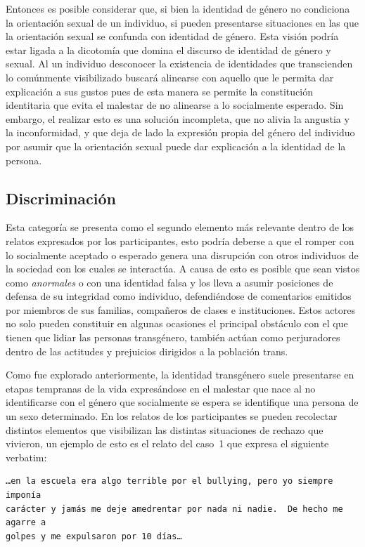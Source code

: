 Entonces es posible considerar que, si bien la identidad de género no condiciona
la orientación sexual de un individuo, si pueden presentarse situaciones en las
que la orientación sexual se confunda con identidad de género. Esta visión
podría estar ligada a la dicotomía que domina el discurso de identidad de género
y sexual. Al un individuo desconocer la existencia de identidades que
transcienden lo comúnmente visibilizado buscará alinearse con aquello que le
permita dar explicación a sus gustos pues de esta manera se permite la
constitución identitaria que evita el malestar de no alinearse a lo socialmente
esperado. Sin embargo, el realizar esto es una solución incompleta, que no
alivia la angustia y la inconformidad, y que deja de lado la expresión propia
del género del individuo por asumir que la orientación sexual puede dar
explicación a la identidad de la persona.

\subsection{Discriminación}\label{ssec:discriminacion}

Esta categoría se presenta como el segundo elemento más relevante dentro de los
relatos expresados por los participantes, esto podría deberse a que el romper
con lo socialmente aceptado o esperado genera una disrupción con otros
individuos de la sociedad con los cuales se interactúa. A causa de esto es
posible que sean vistos como \emph{anormales} o con una identidad falsa y los
lleva a asumir posiciones de defensa de su integridad como individuo,
defendiéndose de comentarios emitidos por miembros de sus familias, compañeros
de clases e instituciones. Estos actores no solo pueden constituir en algunas
ocasiones el principal obstáculo con el que tienen que lidiar las personas
transgénero, también actúan como perjuradores dentro de las actitudes y
prejuicios dirigidos a la población trans.

Como fue explorado anteriormente, la identidad transgénero suele presentarse en
etapas tempranas de la vida expresándose en el malestar que nace al no
identificarse con el género que socialmente se espera se identifique una persona
de un sexo determinado. En los relatos de los participantes se pueden recolectar
distintos elementos que visibilizan las distintas situaciones de rechazo que
vivieron, un ejemplo de esto es el relato del caso~1 que expresa el siguiente
verbatim:

\begin{verbatim}
…en la escuela era algo terrible por el bullying, pero yo siempre imponía
carácter y jamás me deje amedrentar por nada ni nadie.  De hecho me agarre a
golpes y me expulsaron por 10 días…
\end{verbatim}

